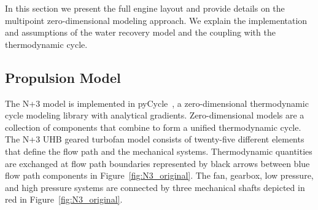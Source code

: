 \documentclass[conf]{new-aiaa}
\begin{document}
In this section we present the full engine layout and provide details on the multipoint zero-dimensional modeling approach.
We explain the implementation and assumptions of the water recovery model and the coupling with the thermodynamic cycle.

\subsection{Propulsion Model}
The N+3 model is implemented in pyCycle~\cite{Hendricks2019}, a zero-dimensional thermodynamic cycle modeling library with analytical gradients.
Zero-dimensional models are a collection of components that combine to form a unified thermodynamic cycle.
The N+3 UHB geared turbofan model consists of twenty-five different elements that define the flow path and the mechanical systems.
Thermodynamic quantities are exchanged at flow path boundaries represented by black arrows between blue flow path components in Figure~\ref{fig:N3_original}.
The fan, gearbox, low pressure, and high pressure systems are connected by three mechanical shafts depicted in red in Figure~\ref{fig:N3_original}.
\end{document}
